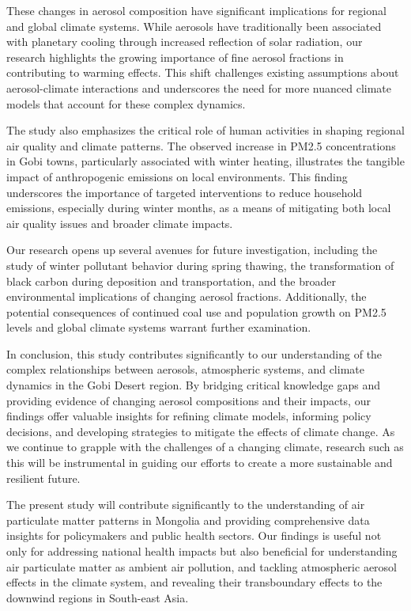 \documentclass[
  11pt,
]{article}
\begin{document}
These changes in aerosol composition have significant implications for
regional and global climate systems. While aerosols have traditionally
been associated with planetary cooling through increased reflection of
solar radiation, our research highlights the growing importance of fine
aerosol fractions in contributing to warming effects. This shift
challenges existing assumptions about aerosol-climate interactions and
underscores the need for more nuanced climate models that account for
these complex dynamics.

The study also emphasizes the critical role of human activities in
shaping regional air quality and climate patterns. The observed increase
in PM2.5 concentrations in Gobi towns, particularly associated with
winter heating, illustrates the tangible impact of anthropogenic
emissions on local environments. This finding underscores the importance
of targeted interventions to reduce household emissions, especially
during winter months, as a means of mitigating both local air quality
issues and broader climate impacts.

Our research opens up several avenues for future investigation,
including the study of winter pollutant behavior during spring thawing,
the transformation of black carbon during deposition and transportation,
and the broader environmental implications of changing aerosol
fractions. Additionally, the potential consequences of continued coal
use and population growth on PM2.5 levels and global climate systems
warrant further examination.

In conclusion, this study contributes significantly to our understanding
of the complex relationships between aerosols, atmospheric systems, and
climate dynamics in the Gobi Desert region. By bridging critical
knowledge gaps and providing evidence of changing aerosol compositions
and their impacts, our findings offer valuable insights for refining
climate models, informing policy decisions, and developing strategies to
mitigate the effects of climate change. As we continue to grapple with
the challenges of a changing climate, research such as this will be
instrumental in guiding our efforts to create a more sustainable and
resilient future.

The present study will contribute significantly to the understanding of
air particulate matter patterns in Mongolia and providing comprehensive
data insights for policymakers and public health sectors. Our findings
is useful not only for addressing national health impacts but also
beneficial for understanding air particulate matter as ambient air
pollution, and tackling atmospheric aerosol effects in the climate
system, and revealing their transboundary effects to the downwind
regions in South-east Asia.
\end{document}
